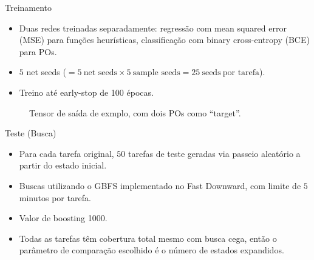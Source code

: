 \documentclass{beamer}
\begin{document}
\begin{frame}{Treinamento}
\begin{itemize}
  \item Duas redes treinadas separadamente: \alert{regressão} com mean squared error (MSE) para funções heurísticas, \alert{classificação} com binary cross-entropy (BCE) para POs.
  \pause
  \item $5$ net seeds ($= 5~\text{net seeds} \times 5~\text{sample seeds} = 25~\text{seeds}~\text{por tarefa}$).
  \pause
  \item Treino até \alert{early-stop} de 100 épocas. %
\end{itemize}

\pause
\begin{figure}[tb]
\caption[]{Tensor de saída de exmplo, com dois POs como ``target''.}
\centering
{}
\label{fig:po-tensor}
\end{figure}

\end{frame}

\begin{frame}{Teste (Busca)}
\begin{itemize}
  \item Para cada tarefa original, \alert{$50$ tarefas de teste} geradas via passeio aleatório a partir do estado inicial.
  \pause
  \item Buscas utilizando o GBFS implementado no Fast Downward, com limite de \alert{$5$ minutos} por tarefa.
  \pause
  \item Valor de \alert{boosting 1000}.
  \pause
  \item Todas as tarefas têm cobertura total mesmo com busca cega, então o parâmetro de comparação escolhido é o \alert{número de estados expandidos}.
\end{itemize}
\end{frame}
\end{document}
